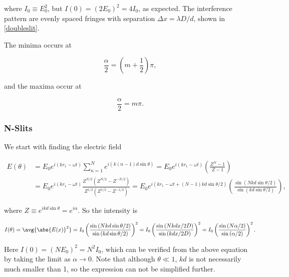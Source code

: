 \documentclass[english,a4paper,12pt]{report}
\begin{document}
where \(I_0 \equiv  E_0 ^2\), but \(I(0) = (2E_0 )^2 = 4I_0 \), as expected. The interference pattern are evenly spaced fringes with separation \(\Delta x = \lambda D /d\), shown in \cref{doubleslit}. 

The minima occurs at 

\begin{equation}
    \frac{\alpha }{2} = (m+\frac{1}{2} )\pi , 
\end{equation}

and the maxima occur at 

\begin{equation}
    \frac{\alpha }{2} = m\pi . 
\end{equation}


\subsubsection{N-Slits}

We start with finding the electric field 

\begin{equation}
    \begin{aligned} 
    E(\theta ) &= E_0 e^{i(kr_1 -\omega t)} \sum_{n=1}^{N} e^{i(k(n-1)d\sin \theta )} = E_0 e^{i(kr_1 - \omega t)} \left( \frac{Z^{N}-1 }{Z-1}  \right) \\
    &= E_0 e^{i(kr_1 -\omega t)} \frac{Z^{N /2}(Z^{N /2} - Z^{-N /2}  ) }{Z^{1 /2} (Z^{1 /2} - Z^{- 1/2}  ) } = E_0 e^{i(kr_1 -\omega t + (N-1)kd\sin \theta /2)} \left( \frac{\sin \left(Nkd\sin \theta /2\right)}{\sin \left( kd\sin \theta /2  \right)}  \right),
    \end{aligned}        
\end{equation}

where \(Z \equiv e^{ikd\sin \theta } = e^{i\alpha }   \). So the intensity is 

\begin{equation}
    I(\theta ) = \avg{\abs{E(x)}^2 } = I_0 \left( \frac{\sin \left( Nkd\sin \theta /2 \right)}{\sin \left(k d\sin \theta /2  \right)}  \right)^2 = I_0 \left( \frac{\sin \left( Nkdx/2D  \right)}{\sin \left( kdx/2D \right)}  \right)^2 = I_0 \left( \frac{\sin \left(N\alpha /2 \right)}{\sin \left(\alpha /2  \right)}  \right)^2. \label{Nslits} 
\end{equation}

Here \(I (0) = (NE_0 )^2 = N^2I_0 \), which can be verified from the above equation by taking the limit as \(\alpha \to 0\). Note that although \(\theta \ll 1\), \(kd\) is not necessarily much smaller than 1, so the expression can not be simplified further. 
\end{document}
